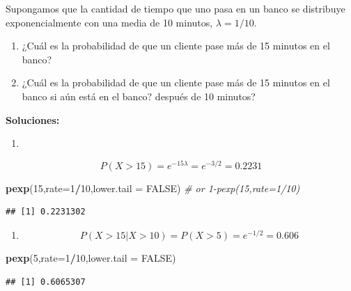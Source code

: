 \documentclass[]{book}
\newenvironment{Shaded}{\begin{snugshade}}{\end{snugshade}}
\newcommand{\KeywordTok}[1]{\textcolor[rgb]{0.13,0.29,0.53}{\textbf{#1}}}
\newcommand{\DataTypeTok}[1]{\textcolor[rgb]{0.13,0.29,0.53}{#1}}
\newcommand{\DecValTok}[1]{\textcolor[rgb]{0.00,0.00,0.81}{#1}}
\newcommand{\CommentTok}[1]{\textcolor[rgb]{0.56,0.35,0.01}{\textit{#1}}}
\newcommand{\OtherTok}[1]{\textcolor[rgb]{0.56,0.35,0.01}{#1}}
\newcommand{\OperatorTok}[1]{\textcolor[rgb]{0.81,0.36,0.00}{\textbf{#1}}}
\newcommand{\NormalTok}[1]{#1}
\providecommand{\tightlist}{%
  \setlength{\itemsep}{0pt}\setlength{\parskip}{0pt}}
\begin{document}
Supongamos que la cantidad de tiempo que uno pasa en un banco se
distribuye exponencialmente con una media de 10 minutos,
\(\lambda=1/10\).

\begin{enumerate}
\def\labelenumi{\alph{enumi}.}
\tightlist
\item
  ¿Cuál es la probabilidad de que un cliente pase más de 15 minutos en
  el banco?
\item
  ¿Cuál es la probabilidad de que un cliente pase más de 15 minutos en
  el banco si aún está en el banco? después de 10 minutos?
\end{enumerate}

\textbf{Soluciones:}

\begin{enumerate}
\def\labelenumi{\alph{enumi}.}
\item
\end{enumerate}

\[
P(X>15)=e^{-15\lambda}=e^{-3/2}=0.2231
\]

\begin{Shaded}
\begin{Highlighting}[]
\KeywordTok{pexp}\NormalTok{(}\DecValTok{15}\NormalTok{,}\DataTypeTok{rate=}\DecValTok{1}\OperatorTok{/}\DecValTok{10}\NormalTok{,}\DataTypeTok{lower.tail =} \OtherTok{FALSE}\NormalTok{) }\CommentTok{# or 1-pexp(15,rate=1/10)}
\end{Highlighting}
\end{Shaded}

\begin{verbatim}
## [1] 0.2231302
\end{verbatim}

\begin{enumerate}
\def\labelenumi{\alph{enumi}.}
\setcounter{enumi}{1}
\tightlist
\item
  \[
  P(X>15 | X>10)=P(X>5)=e^{-1/2}=0.606
  \]
\end{enumerate}

\begin{Shaded}
\begin{Highlighting}[]
\KeywordTok{pexp}\NormalTok{(}\DecValTok{5}\NormalTok{,}\DataTypeTok{rate=}\DecValTok{1}\OperatorTok{/}\DecValTok{10}\NormalTok{,}\DataTypeTok{lower.tail =} \OtherTok{FALSE}\NormalTok{)}
\end{Highlighting}
\end{Shaded}

\begin{verbatim}
## [1] 0.6065307
\end{verbatim}
\end{document}
